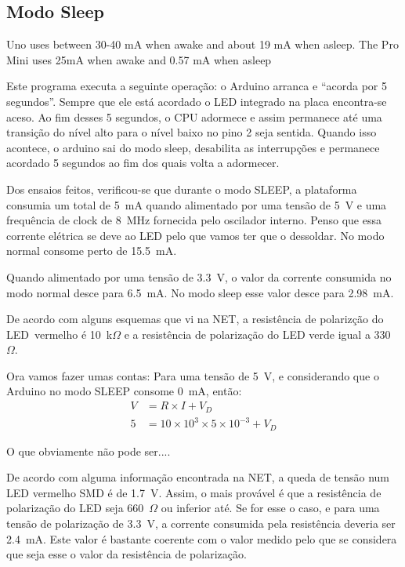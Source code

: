 \documentclass{article}
\begin{document}
\subsection{Modo Sleep}

Uno uses between 30-40 mA when awake and about 19 mA when asleep. The Pro Mini uses 25mA when awake and 0.57 mA when asleep



Este programa executa a seguinte operação: o Arduino arranca e ``acorda por 5 segundos''. Sempre que ele está acordado o LED integrado na placa encontra-se aceso. Ao fim desses 5 segundos, o CPU adormece e assim permanece até uma transição do nível alto para o nível baixo no pino 2 seja sentida. Quando isso acontece, o arduino sai do modo sleep, desabilita as interrupções e permanece acordado 5 segundos ao fim dos quais volta a adormecer.


Dos ensaios feitos, verificou-se que durante o modo SLEEP, a plataforma consumia um total de 5~mA quando alimentado por uma tensão de 5~V e uma frequência de clock de 8~MHz fornecida pelo oscilador interno. Penso que essa corrente elétrica se deve ao LED pelo que vamos ter que o dessoldar. No modo normal consome perto de 15.5~mA.        

Quando alimentado por uma tensão de 3.3~V, o valor da corrente consumida no modo normal desce para 6.5~mA. No modo sleep esse valor desce para 2.98~mA.

De acordo com alguns esquemas que vi na NET, a resistência de polarizção do LED\ vermelho é 10~k$\Omega$ e a resistência de polarização do LED verde igual a 330~$\Omega$.
 
Ora vamos fazer umas contas: Para uma tensão de 5~V, e considerando que o Arduino no modo SLEEP consome 0~mA, então:
\begin{equation}
\begin{split}
V &= R \times I + V_D\\
5 &= 10 \times 10^3 \times 5 \times 10^{-3} + V_D
\end{split}
\end{equation}

O que obviamente não pode ser....

De acordo com alguma informação encontrada na NET, a queda de tensão num LED vermelho SMD é de 1.7~V. Assim, o mais provável é que a resistência de polarização do LED seja 660~$\Omega$ ou inferior até. Se for esse o caso, e para uma tensão de polarização de 3.3~V, a corrente consumida pela resistência deveria ser 2.4~mA. Este valor é bastante coerente com o valor medido pelo que se considera que seja esse o valor da resistência de polarização.
\end{document}
